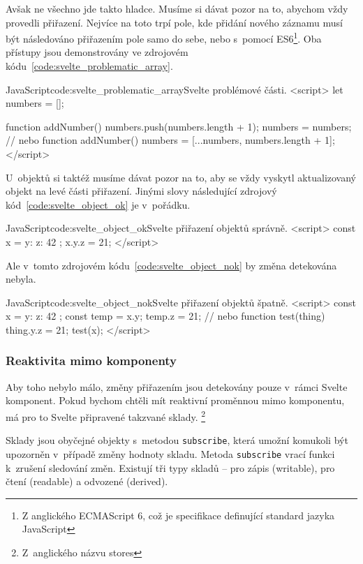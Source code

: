 \documentclass[
  master,
  program=ainf,
  tables=false,
  sourcecodes,
  glossaries,
  index
]{kidiplom}
\begin{document}
Avšak ne všechno jde takto hladce. Musíme si dávat pozor na to, abychom vždy provedli přiřazení.
Nejvíce na toto trpí pole, kde přidání nového záznamu musí být následováno přiřazením pole
samo do sebe, nebo s~pomocí ES6\footnote{Z anglického ECMAScript 6, což je specifikace definující standard jazyka JavaScript}. Oba přístupy jsou demonstrovány ve zdrojovém kódu~\ref{code:svelte_problematic_array}.

  \begin{kicode}{JavaScript}{code:svelte_problematic_array}{Svelte problémové části.}
    <script>
      let numbers = [];

      function addNumber() {
        numbers.push(numbers.length + 1);
        numbers = numbers;
      }
      // nebo
      function addNumber() {
        numbers = [...numbers, numbers.length + 1];
      }
    </script>
  \end{kicode}


U~objektů si taktéž musíme dávat pozor na to, aby se vždy vyskytl aktualizovaný objekt na levé části přiřazení.
Jinými slovy následující zdrojový kód~\ref{code:svelte_object_ok} je v~pořádku.

  \begin{kicode}{JavaScript}{code:svelte_object_ok}{Svelte přiřazení objektů správně.}
    <script>
      const x = { y: { z: 42 }};
      x.y.z = 21;
    </script>
  \end{kicode}

Ale v~tomto zdrojovém kódu~\ref{code:svelte_object_nok} by změna detekována nebyla.

  \begin{kicode}{JavaScript}{code:svelte_object_nok}{Svelte přiřazení objektů špatně.}
    <script>
      const x = { y: { z: 42 }};
      const temp = x.y;
      temp.z = 21;
      // nebo
      function test(thing) {
        thing.y.z = 21;
      }
      test(x);
    </script>
  \end{kicode}


\subsubsection{Reaktivita mimo komponenty}

Aby toho nebylo málo, změny přiřazením jsou detekovány pouze v~rámci Svelte komponent. Pokud bychom
chtěli mít reaktivní proměnnou mimo komponentu, má pro to Svelte \cite{svelte} připravené takzvané sklady.
\footnote{Z~anglického názvu stores} 

Sklady jsou obyčejné objekty s~metodou {\tt subscribe}, která umožní komukoli být upozorněn v~případě změny
hodnoty skladu. Metoda {\tt subscribe} vrací funkci k~zrušení sledování změn. Existují tři typy 
skladů -- pro zápis (writable), pro čtení (readable) a odvozené (derived).
\end{document}
